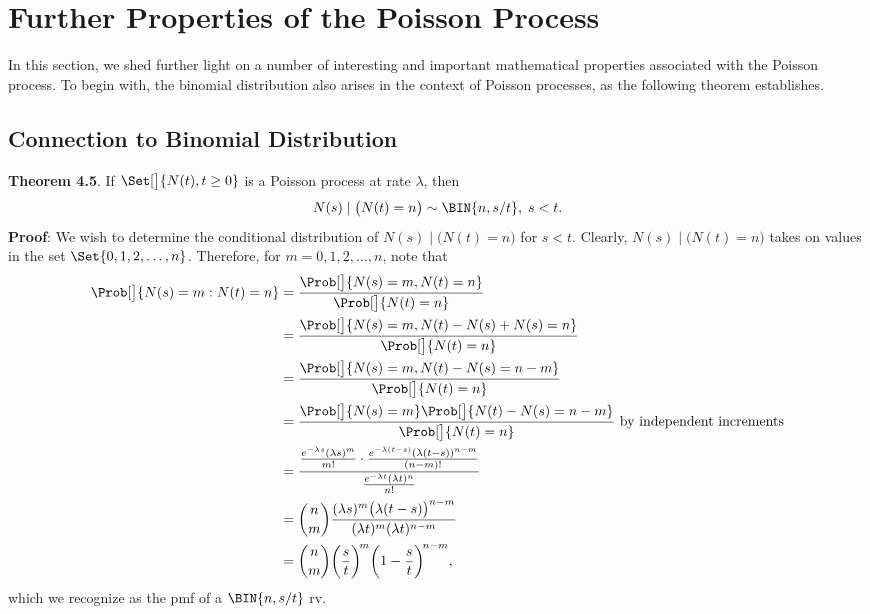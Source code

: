 \section{Further Properties of the Poisson Process}
In this section, we shed further light on a number of interesting and important mathematical
properties associated with the Poisson process. To begin with, the binomial distribution also
arises in the context of Poisson processes, as the following theorem establishes.
\subsection*{Connection to Binomial Distribution}
\begin{Result}
    \textbf{Theorem 4.5}. If $ \Set[\big]{N(t),t\ge 0} $ is a Poisson process at rate $ \lambda $, then
    \[ N(s)\mid \bigl(N(t)=n\bigr) \sim \BIN{n,s/t},\; s<t. \]
    \tcblower{}
    \textbf{Proof}: We wish to determine the conditional distribution
    of $ N(s)\mid \bigl(N(t)=n\bigr) $ for $ s<t $. Clearly,
    $ N(s)\mid \bigl(N(t)=n\bigr) $ takes on values in the set
    $ \Set{0,1,2,\ldots,n} $. Therefore, for $ m=0,1,2,\ldots,n $,
    note that
    \begin{align*}
        \Prob[\big]{N(s)=m\given N(t)=n}
         & =\frac{\Prob[\big]{N(s)=m,N(t)=n}}{\Prob[\big]{N(t)=n}}                                                                                     \\
         & =\frac{\Prob[\big]{N(s)=m,N(t)-N(s)+N(s)=n}}{\Prob[\big]{N(t)=n}}                                                                           \\
         & =\frac{\Prob[\big]{N(s)=m,N(t)-N(s)=n-m}}{\Prob[\big]{N(t)=n}}                                                                              \\
         & =\frac{\Prob[\big]{N(s)=m}\Prob[\big]{N(t)-N(s)=n-m}}{\Prob[\big]{N(t)=n}}
        \text{ by independent increments}                                                                                                              \\
         & =
        \frac{\frac{e^{-\lambda s}(\lambda s)^m}{m!}\cdot\frac{e^{-\lambda(t-s)}(\lambda(t-s))^{n-m}}{(n-m)!}}{\frac{e^{-\lambda t}(\lambda t)^n}{n!}} \\
         & =\binom{n}{m}\frac{(\lambda s)^m\bigl(\lambda(t-s)\bigr)^{n-m}}{(\lambda t)^m(\lambda t)^{n-m}}                                             \\
         & =\binom{n}{m}\biggl(\frac{s}{t}\biggr)^{\!m}\biggl(1-\frac{s}{t}\biggr)^{\!n-m},
    \end{align*}
    which we recognize as the pmf of a $ \BIN{n,s/t} $ rv.
\end{Result}
